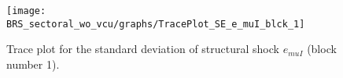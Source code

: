 \begin{figure}[H]
\centering
  \texttt{[image: BRS\_sectoral\_wo\_vcu/graphs/TracePlot\_SE\_e\_muI\_blck\_1]}\\
    \caption{Trace plot for the standard deviation of structural shock ${e_{muI}}$ (block number 1).}
\end{figure}
